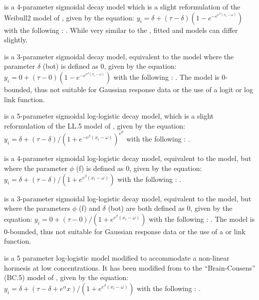 \documentclass[
  shortnames]{jss}
\begin{document}
 is a 4-parameter sigmoidal decay model which is a slight reformulation of the Weibull2 model of \citet{Ritz2016}, given by the equation:
\(y_i = \delta + (\tau - \delta) (1 - e^{-e^{e^{\beta} (x_i - \omega)}})\)
with the following : . While very similar to the  \citep[according to][]{Ritz2016}, fitted  and  models can differ slightly.

 is a 3-parameter sigmoidal decay model, equivalent to the  model where the parameter \(\delta\) (bot) is defined as 0, given by the equation:
\(y_i = {0} + (\tau -{0}) (1 - e^{-e^{e^{\beta} (x_i - \omega)}})\)
with the following : . The model is 0-bounded, thus not suitable for Gaussian response data or the use of a logit or log link function.

 is a 5-parameter sigmoidal log-logistic decay model, which is a slight reformulation of the LL.5 model of \citet{Ritz2016}, given by the equation:
\(y_i = \delta + (\tau - \delta) / (1 + e^{-e^{\beta} (x_i - \omega)})^{e^\phi}\)
with the following : .

 is a 4-parameter sigmoidal log-logistic decay model, equivalent to the  model, but where the parameter \(\phi\) (f) is defined as 0, given by the equation:
\(y_i = \delta + (\tau - \delta)/ (1 + e^{e^{\beta} (x_i - \omega)})\)
with the following : .

 is a 3-parameter sigmoidal log-logistic decay model, equivalent to the  model, but where the parameters \(\phi\) (f) and \(\delta\) (bot) are both defined as 0, given by the equation:
\(y_i = 0 + (\tau - 0)/ (1 + e^{e^{\beta} (x_i - \omega)})\)
with the following : . The model is 0-bounded, thus not suitable for Gaussian response data or the use of a  or  link function.

 is a 5 parameter log-logistic model modified to accommodate a non-linear hormesis at low concentrations. It has been modified from to the ``Brain-Cousens'' (BC.5) model of \citet{Ritz2016}, given by the equation:
\(y_i = \delta + (\tau - \delta + e^{\alpha} x)/ (1 + e^{e^{\beta} (x_i - \omega)})\)
with the following : .
\end{document}
